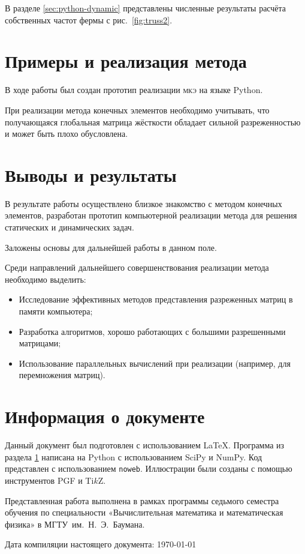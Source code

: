 \documentclass[10pt]{article}
\numberwithin{equation}{section}
\newcommand{\program}[1]{{\tt #1}}
\newcommand{\fem}{\textsc{мкэ}}
\newcommand{\figref}[1]{рис. \ref{#1}}
\begin{document}
В разделе \ref{sec:python-dynamic} представлены численные результаты
расчёта собственных частот фермы с \figref{fig:truss2}.

\section{Примеры и реализация метода}
\label{sec:python}

В ходе работы был создан прототип реализации \fem{} на языке Python.

При реализации метода конечных элементов необходимо учитывать, что
получающаяся глобальная матрица жёсткости обладает сильной
разреженностью и может быть плохо обусловлена.



\section{Выводы и результаты}

В результате работы осуществлено близкое знакомство с методом конечных
элементов, разработан прототип компьютерной реализации метода для
решения статических и динамических задач.

Заложены основы для дальнейшей работы в данном поле.

Среди направлений дальнейшего совершенствования реализации метода
необходимо выделить:
\begin{itemize}
\item Исследование эффективных методов представления разреженных
  матриц в памяти компьютера;

\item Разработка алгоритмов, хорошо работающих с большими разрешенными
  матрицами;

\item Использование параллельных вычислений при реализации (например,
  для перемножения матриц).
\end{itemize}

\clearpage
\appendix
\section{Информация о документе}

Данный документ был подготовлен с использованием \LaTeX{}. Программа
из раздела \ref{sec:python} написана на Python с использованием SciPy
и NumPy. Код представлен с использованием \program{noweb}. Иллюстрации
были созданы с помощью инструментов PGF и Ti$k$Z.

Представленная работа выполнена в рамках программы седьмого семестра
обучения по специальности «Вычислительная математика и математическая
физика» в МГТУ им. Н. Э. Баумана.

Дата компиляции настоящего документа: \today



\end{document}
